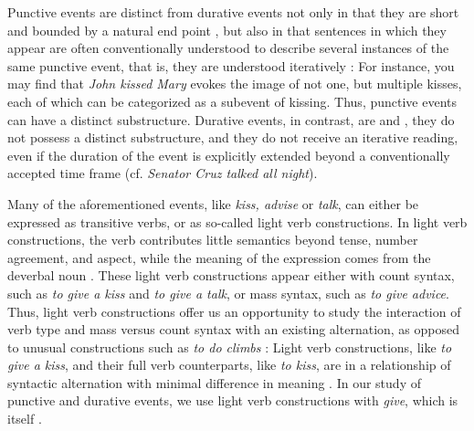 \documentclass[preprint,12pt,authoryear]{elsarticle}
\begin{document}

Punctive events are distinct from durative events not only in that they are  short and bounded by a natural end point , but also in that sentences in which they appear are often conventionally understood to describe several instances of the same punctive event, that is, they are understood iteratively \citep{paczynski2014events,barner2008events,Kim2015}: For instance, you may find that \emph{John kissed Mary} evokes the image of not one, but multiple kisses, each of which can be categorized as a subevent of kissing. Thus, punctive events can have a distinct substructure. Durative events, in contrast, are  and , they do not possess a distinct substructure, and they do not receive an iterative reading, even if the duration of the event is explicitly extended beyond a conventionally accepted time frame (cf. \emph{Senator Cruz talked all night}). 

Many of the aforementioned events, like \emph{kiss, advise} or \emph{talk}, can either be expressed as transitive verbs, or as so-called light verb constructions. In light verb constructions, the verb contributes little semantics beyond tense, number agreement, and aspect, while the meaning of the expression comes from the deverbal noun \citep{Jespersen1954,Wiese2006,Jackendoff1974,Brugman2001,Butt2003,butt2010}. These light verb constructions appear either with count syntax, such as \emph{to give a kiss} and \emph{to give a talk}, or mass syntax, such as \emph{to give advice}. Thus, light verb constructions offer us an opportunity to study the interaction of verb type and mass versus count syntax with an existing alternation, as opposed to unusual constructions such as \emph{to do climbs} \citep{barner2008events}: Light verb constructions, like \emph{to give a kiss}, and their full verb counterparts, like \emph{to kiss}, are in a relationship of syntactic alternation with minimal difference in meaning \citep{glatz2006funktionsverbgefuge,Allerton2002}. In our study of punctive and durative events, we use light verb constructions with \emph{give}, which is itself  \citep{newman1996}.
\end{document}
